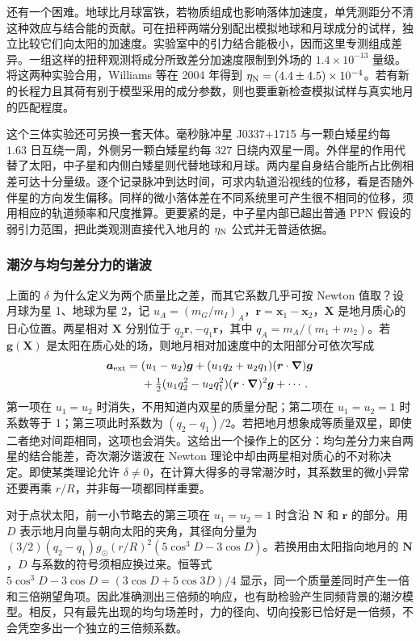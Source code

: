 还有一个困难。地球比月球富铁，若物质组成也影响落体加速度，单凭测距分不清这种效应与结合能的贡献。可在扭秤两端分别配出模拟地球和月球成分的试样，独立比较它们向太阳的加速度。实验室中的引力结合能极小，因而这里专测组成差异。一组这样的扭秤观测将成分所致差分加速度限制到外场的 $1.4\times10^{-13}$ 量级。将这两种实验合用，Williams 等在 2004 年得到 $\eta_{\rm N}=(4.4\pm4.5)\times10^{-4}$。若有新的长程力且其荷有别于模型采用的成分参数，则也要重新检查模拟试样与真实地月的匹配程度。

这个三体实验还可另换一套天体。毫秒脉冲星 J0337+1715 与一颗白矮星约每 $1.63$ 日互绕一周，外侧另一颗白矮星约每 $327$ 日绕内双星一周。外伴星的作用代替了太阳，中子星和内侧白矮星则代替地球和月球。两内星自身结合能所占比例相差可达十分量级。逐个记录脉冲到达时间，可求内轨道沿视线的位移，看是否随外伴星的方向发生偏移。同样的微小落体差在不同系统里可产生很不相同的位移，须用相应的轨道频率和尺度推算。更要紧的是，中子星内部已超出普通 PPN 假设的弱引力范围，把此类观测直接代入地月的 $\eta_{\rm N}$ 公式并无普适依据。

\subsubsection{潮汐与均匀差分力的谐波}

上面的 $\delta$ 为什么定义为两个质量比之差，而其它系数几乎可按 Newton 值取？设月球为星 1、地球为星 2，记 $u_A=(m_G/m_I)_A$，$\bm r=\bm x_1-\bm x_2$，$\bm X$ 是地月质心的日心位置。两星相对 $\bm X$ 分别位于 $q_2\bm r,-q_1\bm r$，其中 $q_A=m_A/(m_1+m_2)$。若 $\bm g(\bm X)$ 是太阳在质心处的场，则地月相对加速度中的太阳部分可依次写成
\begin{align*}
 \bm a_{\rm ext}={}&(u_1-u_2)\bm g
 +(u_1q_2+u_2q_1)(\bm r\cdot\bm\nabla)\bm g\\
 &+\tfrac12(u_1q_2^2-u_2q_1^2)(\bm r\cdot\bm\nabla)^2\bm g+\cdots .
\end{align*}
第一项在 $u_1=u_2$ 时消失，不用知道内双星的质量分配；第二项在 $u_1=u_2=1$ 时系数等于 1；第三项此时系数为 $(q_2-q_1)/2$。若把地月想象成等质量双星，即使二者绝对间距相同，这项也会消失。这给出一个操作上的区分：均匀差分力来自两星的结合能差，奇次潮汐谐波在 Newton 理论中却由两星相对质心的不对称决定。即使某类理论允许 $\delta\ne0$，在计算大得多的寻常潮汐时，其系数里的微小异常还要再乘 $r/R$，并非每一项都同样重要。

对于点状太阳，前一小节略去的第三项在 $u_1=u_2=1$ 时含沿 $\bm N$ 和 $\bm r$ 的部分。用 $D$ 表示地月向量与朝向太阳的夹角，其径向分量为 $(3/2)(q_2-q_1)g_\odot(r/R)^2(5\cos^3D-3\cos D)$。若换用由太阳指向地月的 $\bm N$，$D$ 与系数的符号须相应换过来。恒等式 $5\cos^3D-3\cos D=(3\cos D+5\cos3D)/4$ 显示，同一个质量差同时产生一倍和三倍朔望角项。因此准确测出三倍频的响应，也有助检验产生同频背景的潮汐模型。相反，只有最先出现的均匀场差时，力的径向、切向投影已恰好是一倍频，不会凭空多出一个独立的三倍频系数。

